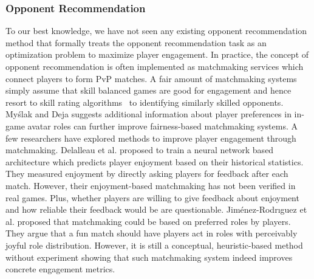 
\subsubsection{Opponent Recommendation}
To our best knowledge, we have not seen any existing opponent recommendation method that formally treats the opponent recommendation task as an optimization problem to maximize player engagement.
 In practice, the concept of opponent recommendation is often implemented as matchmaking services which connect players to form PvP matches. A fair amount of matchmaking systems simply assume that skill balanced games are good for engagement \cite{graepel2006ranking,sweetser2005gameflow,flow1990psychology,chen2007flow} and hence resort to skill rating algorithms~\cite{glickman1999parameter,elo1978rating,herbrich:trueskill} to identifying similarly skilled opponents. My\'{s}lak and Deja \cite{myslak2014developing} suggests additional information about player preferences in in-game avatar roles can further improve fairness-based matchmaking systems. A few researchers have explored methods to improve player engagement through matchmaking. Delalleau et al. \cite{Delalleau2012} proposed to train a neural network based architecture which predicts player enjoyment based on their historical statistics. They measured enjoyment by directly asking players for feedback after each match. However, their enjoyment-based matchmaking has not been verified in real games. Plus, whether players are willing to give feedback about enjoyment and how reliable their feedback would be are questionable. Jim{\'e}nez-Rodr{\i}guez et al. \cite{jimenez2011matchmaking} proposed that matchmaking could be based on preferred roles by players. They argue that a fun match should have players act in  roles with perceivably joyful role distribution. However, it is still a conceptual, heuristic-based method without experiment showing that such matchmaking system indeed improves concrete engagement metrics. 



